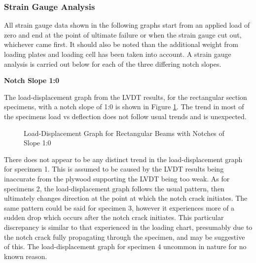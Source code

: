 \documentclass[11pt,a4paper]{article}
\numberwithin{equation}{subsection}
\begin{document}
\subsubsection{Strain Gauge Analysis}
All strain gauge data shown in the following graphs start from an applied load of zero and end at the point of ultimate failure or when the strain gauge cut out, whichever came first. It should also be noted than the additional weight from loading plates and loading cell has been taken into account. A strain gauge analysis is carried out below for each of the three differing notch slopes.

\vspace*{\baselineskip}

\noindent
\textbf{Notch Slope 1:0}\par
\noindent
The load-displacement graph from the LVDT results, for the rectangular section specimens, with a notch slope of 1:0 is shown in Figure \ref{fig:Rect_10_def}. The trend in most of the specimens load vs deflection does not follow usual trends and is unexpected.
\vspace*{\baselineskip}
\begin{figure}[h]
	\begin{center}
	\end{center}
	\caption{Load-Displacement Graph for Rectangular Beams with Notches of Slope 1:0}
	\label{fig:Rect_10_def}
\end{figure}

\noindent
There does not appear to be any distinct trend in the load-displacement graph for specimen 1. This is assumed to be caused by the LVDT results being inaccurate from the plywood supporting the LVDT being too weak. As for specimens 2, the load-displacement graph follows the usual pattern, then ultimately changes direction at the point at which the notch crack initiates. The same pattern could be said for specimen 3, however it experiences more of a sudden drop which occurs after the notch crack initiates. This particular discrepancy is similar to that experienced in the loading chart, presumably due to the notch crack fully propagating through the specimen, and may be suggestive of this. The load-displacement graph for specimen 4 uncommon in nature for no known reason.   
\vspace*{\baselineskip}
\end{document}
